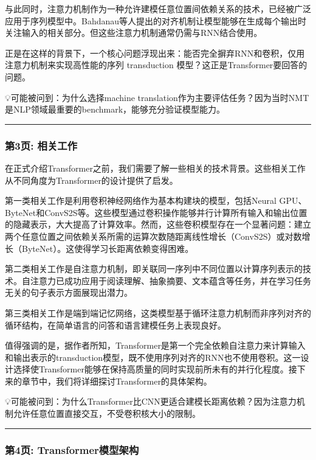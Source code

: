 \documentclass[11pt,a4paper]{article}
\begin{document}
与此同时，注意力机制作为一种允许建模任意位置间依赖关系的技术，已经被广泛应用于序列模型中。Bahdanau等人提出的对齐机制让模型能够在生成每个输出时关注输入的相关部分。但这些注意力机制通常仍需与RNN结合使用。

正是在这样的背景下，一个核心问题浮现出来：能否完全摒弃RNN和卷积，仅用注意力机制来实现高性能的序列 transduction 模型？这正是Transformer要回答的问题。

💡可能被问到：为什么选择machine translation作为主要评估任务？因为当时NMT是NLP领域最重要的benchmark，能够充分验证模型能力。

\vspace{0.5em}\noindent\rule{\textwidth}{0.4pt}\vspace{0.5em}

\subsubsection*{第3页: 相关工作}

在正式介绍Transformer之前，我们需要了解一些相关的技术背景。这些相关工作从不同角度为Transformer的设计提供了启发。

第一类相关工作是利用卷积神经网络作为基本构建块的模型，包括Neural GPU、ByteNet和ConvS2S等。这些模型通过卷积操作能够并行计算所有输入和输出位置的隐藏表示，大大提高了计算效率。然而，这些卷积模型存在一个显著问题：建立两个任意位置之间依赖关系所需的运算次数随距离线性增长（ConvS2S）或对数增长（ByteNet）。这使得学习长距离依赖变得困难。

第二类相关工作是自注意力机制，即关联同一序列中不同位置以计算序列表示的技术。自注意力已成功应用于阅读理解、抽象摘要、文本蕴含等任务，并在学习任务无关的句子表示方面展现出潜力。

第三类相关工作是端到端记忆网络，这类模型基于循环注意力机制而非序列对齐的循环结构，在简单语言的问答和语言建模任务上表现良好。

值得强调的是，据作者所知，Transformer是第一个完全依赖自注意力来计算输入和输出表示的transduction模型，既不使用序列对齐的RNN也不使用卷积。这一设计选择使Transformer能够在保持高质量的同时实现前所未有的并行化程度。接下来的章节中，我们将详细探讨Transformer的具体架构。

💡可能被问到：为什么Transformer比CNN更适合建模长距离依赖？因为注意力机制允许任意位置直接交互，不受卷积核大小的限制。

\vspace{0.5em}\noindent\rule{\textwidth}{0.4pt}\vspace{0.5em}

\subsubsection*{第4页: Transformer模型架构}
\end{document}
